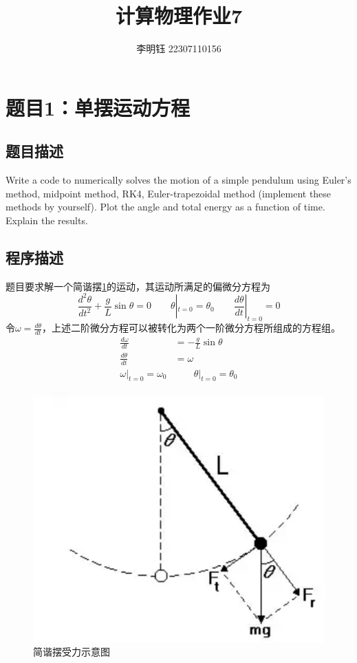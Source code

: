 \documentclass[11pt]{article}
\author{李明钰 22307110156}
\title{计算物理作业7}
\begin{document}
\maketitle


\section{题目1：单摆运动方程}
\subsection{题目描述}
Write a code to numerically solves the motion of a simple pendulum using Euler’s method, midpoint method, RK4, Euler-trapezoidal method (implement these methods by yourself). Plot the angle and total energy as a function of time. Explain the results.

\subsection{程序描述}
题目要求解一个简谐摆\ref{fig:简谐摆受力示意图}的运动，其运动所满足的偏微分方程为
\begin{equation}
    \frac{d^2 \theta}{d t^2} + \frac{g}{L} \sin{\theta} = 0 \qquad 
    \theta|_{t=0} = \theta_0 \qquad \frac{d \theta}{d t}|_{t=0}=0
\end{equation}
令$\omega = \frac{d\theta}{dt}$，上述二阶微分方程可以被转化为两个一阶微分方程所组成的方程组。
\begin{equation}
\begin{aligned}
\frac{d\omega}{dt}&=-\frac{g}{L}\sin{\theta}\\
\frac{d\theta}{dt}&=\omega\\
\omega|_{t=0}=\omega_0 &\qquad \theta|_{t=0}=\theta_0
\end{aligned}
\end{equation}
\begin{figure}[h]
    \centering
    \includegraphics[width=0.3\linewidth]{简谐摆受力示意图.png}
    \caption{简谐摆受力示意图}
    \label{fig:简谐摆受力示意图}
\end{figure}
\end{document}
